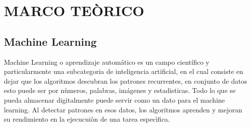 \documentclass[letterpaper]{article}
\begin{document}
\section{MARCO TEÒRICO}
\subsection{Machine Learning}
Machine Learning o aprendizaje automático es un campo científico y particularmente una subcategoria de inteligencia artificial, en el cual consiste en dejar que los algoritmos descubran los patrones recurrentes, en conjunto de datos esto puede ser por nùmeros, palabras, imágenes y estadisticas.
Todo lo que se pueda almacenar digitalmente puede servir como un dato para el machine learning. Al detectar patrones en esos datos, los algoritmos aprenden y mejoran su rendimiento en la ejecucuiòn de una tarea especìfica.
\end{document}
